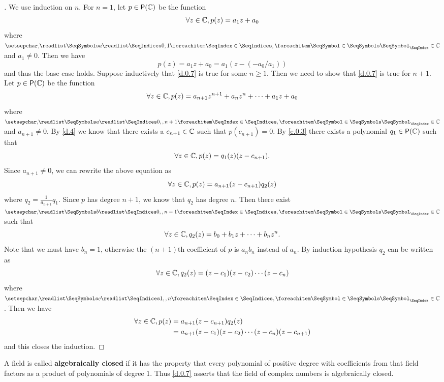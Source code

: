 \begin{proof}[]
  We use induction on \(n\).
  For \(n = 1\), let \(p \in \ps{\C}\) be the function
  \[
    \forall z \in \mathbb{C}, p(z) = a_1 z + a_0
  \]
  where \(\seq{a}{0,1} \in \C\) and \(a_1 \neq 0\).
  Then we have
  \[
    p(z) = a_1 z + a_0 = a_1 (z - (-a_0 / a_1))
  \]
  and thus the base case holds.
  Suppose inductively that \cref{d.0.7} is true for some \(n \geq 1\).
  Then we need to show that \cref{d.0.7} is true for \(n + 1\).
  Let \(p \in \ps{\C}\) be the function
  \[
    \forall z \in \mathbb{C}, p(z) = a_{n + 1} z^{n + 1} + a_n z^n + \cdots + a_1 z + a_0
  \]
  where \(\seq{a}{0,,n+1} \in \C\) and \(a_{n + 1} \neq 0\).
  By \cref{d.4} we know that there exists a \(c_{n + 1} \in \mathbb{C}\) such that \(p(c_{n + 1}) = 0\).
  By \cref{e.0.3} there exists a polynomial \(q_1 \in \ps{\C}\) such that
  \[
    \forall z \in \mathbb{C}, p(z) = q_1(z) (z - c_{n + 1}).
  \]
  Since \(a_{n + 1} \neq 0\), we can rewrite the above equation as
  \[
    \forall z \in \mathbb{C}, p(z) = a_{n + 1} (z - c_{n + 1}) q_2(z)
  \]
  where \(q_2 = \frac{1}{a_{n + 1}} q_1\).
  Since \(p\) has degree \(n + 1\), we know that \(q_2\) has degree \(n\).
  Then there exist \(\seq{b}{0,,n-1} \in \C\) such that
  \[
    \forall z \in \mathbb{C}, q_2(z) = b_0 + b_1 z + \cdots + b_n z^n.
  \]
  Note that we must have \(b_n = 1\), otherwise the \((n + 1)\)th coefficient of \(p\) is \(a_n b_n\) instead of \(a_n\).
  By induction hypothesis \(q_2\) can be written as
  \[
    \forall z \in \mathbb{C}, q_2(z) = (z - c_1) (z - c_2) \cdots (z - c_n)
  \]
  where \(\seq{c}{1,,n} \in \C\).
  Then we have
  \begin{align*}
    \forall z \in \mathbb{C}, p(z) & = a_{n + 1} (z - c_{n + 1}) q_2(z)                               \\
                           & = a_{n + 1} (z - c_1) (z - c_2) \cdots (z - c_n) (z - c_{n + 1})
  \end{align*}
  and this closes the induction.
\end{proof}

\begin{defn}\label{d.0.8}
  A field is called \textbf{algebraically closed} if it has the property that every polynomial of positive degree with coefficients from that field factors as a product of polynomials of degree \(1\).
  Thus \cref{d.0.7} asserts that the field of complex numbers is algebraically closed.
\end{defn}
